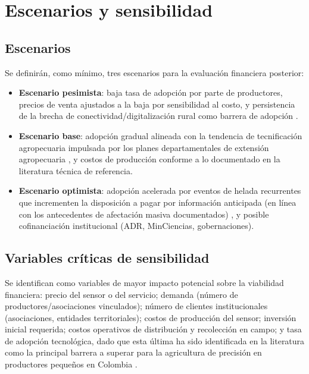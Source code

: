 \documentclass[11pt,a4paper]{article}
\begin{document}
\section{Escenarios y sensibilidad}

\subsection{Escenarios}
Se definirán, como mínimo, tres escenarios para la evaluación financiera posterior:
\begin{itemize}
\item \textbf{Escenario pesimista}: baja tasa de adopción por parte de productores, precios de venta ajustados a la baja por sensibilidad al costo, y persistencia de la brecha de conectividad/digitalización rural como barrera de adopción \citep{mintic2023}.
\item \textbf{Escenario base}: adopción gradual alineada con la tendencia de tecnificación agropecuaria impulsada por los planes departamentales de extensión agropecuaria \citep{adr_pdea_cundinamarca,boyaca_pdd2024}, y costos de producción conforme a lo documentado en la literatura técnica de referencia.
\item \textbf{Escenario optimista}: adopción acelerada por eventos de helada recurrentes que incrementen la disposición a pagar por información anticipada (en línea con los antecedentes de afectación masiva documentados) \citep{boyaca7dias2026,semana2020}, y posible cofinanciación institucional (ADR, MinCiencias, gobernaciones).
\end{itemize}

\subsection{Variables críticas de sensibilidad}
Se identifican como variables de mayor impacto potencial sobre la viabilidad financiera: precio del sensor o del servicio; demanda (número de productores/asociaciones vinculados); número de clientes institucionales (asociaciones, entidades territoriales); costos de producción del sensor; inversión inicial requerida; costos operativos de distribución y recolección en campo; y tasa de adopción tecnológica, dado que esta última ha sido identificada en la literatura como la principal barrera a superar para la agricultura de precisión en productores pequeños en Colombia \citep{scielo2022precision}.

\end{document}

